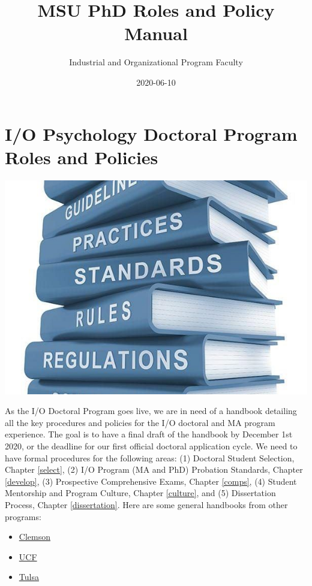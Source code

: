 \documentclass[
]{book}
\title{MSU PhD Roles and Policy Manual}
\author{Industrial and Organizational Program Faculty}
\date{2020-06-10}
\providecommand{\tightlist}{%
  \setlength{\itemsep}{0pt}\setlength{\parskip}{0pt}}
\begin{document}
\maketitle

{
\setcounter{tocdepth}{1}
\tableofcontents
}
\hypertarget{io-psychology-doctoral-program-roles-and-policies}{%
\chapter{I/O Psychology Doctoral Program Roles and Policies}\label{io-psychology-doctoral-program-roles-and-policies}}

\includegraphics{manual.png}

As the I/O Doctoral Program goes live, we are in need of a handbook detailing all the key procedures and policies for the I/O doctoral and MA program experience. The goal is to have a final draft of the handbook by December 1st 2020, or the deadline for our first official doctoral application cycle. We need to have formal procedures for the following areas: (1) Doctoral Student Selection, Chapter \ref{select}, (2) I/O Program (MA and PhD) Probation Standards, Chapter \ref{develop}, (3) Prospective Comprehensive Exams, Chapter \ref{comps}, (4) Student Mentorship and Program Culture, Chapter \ref{culture}, and (5) Dissertation Process, Chapter \ref{dissertation}. Here are some general handbooks from other programs:

\begin{itemize}
\tightlist
\item
  \href{https://www.clemson.edu/cbshs/departments/psychology/files/pdf/handbook-psychology-graduate-current.pdf}{Clemson}
\item
  \href{https://graduate.ucf.edu/wp-content/uploads/2019/05/Industrial-and-Organizational-Psychology-PhD.pdf}{UCF}
\item
  \href{https://artsandsciences.utulsa.edu/wp-content/uploads/sites/6/2015/09/2017-I-O-Handbook.pdf}{Tulsa}
\end{itemize}
\end{document}
